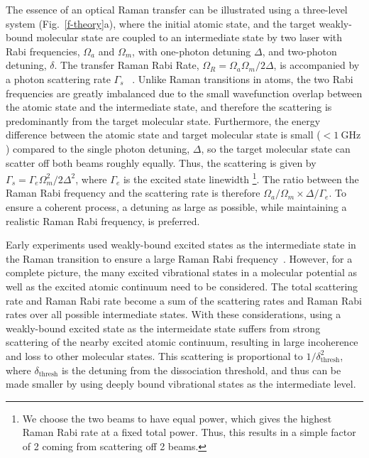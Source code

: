 \documentclass[aps,prl,twocolumn,10pt,superscriptaddress]{revtex4-1}
\begin{document}
The essence of an optical Raman transfer can be illustrated using a three-level system (Fig.~\ref{f-theory}a), where the initial atomic state, and the target weakly-bound molecular state are coupled to an intermediate state by two laser  with Rabi frequencies, $\Omega_a$ and $\Omega_m$, with one-photon detuning $ \Delta $, and two-photon detuning, $ \delta$.  %
The transfer Raman Rabi Rate, $\Omega_R=\Omega_a\Omega_m / 2\Delta$, is accompanied by a photon scattering rate $\Gamma_s$
~\cite{Wineland2003}.
Unlike Raman transitions in atoms, the two Rabi frequencies are greatly imbalanced %
due to the small wavefunction overlap between the atomic state and the intermediate state, %
and therefore the scattering is predominantly from the target molecular state. Furthermore, the energy difference between the atomic state and target molecular state is small ($ < 1~\mathrm{GHz} $) compared to the single photon detuning, $ \Delta $, so the target molecular state can scatter off both beams roughly equally. Thus, the scattering is given by $ \Gamma_s=\Gamma_e \Omega_m^2 / 2\Delta^2$, where $ \Gamma_e $ is the excited state linewidth \footnote{We choose the two beams to have equal power, which gives the highest Raman Rabi rate at a fixed total power. Thus, this results in a simple factor of 2 coming from scattering off 2 beams.}.
The ratio between the Raman Rabi frequency and the scattering rate is therefore $ \Omega_a/\Omega_m \times \Delta/\Gamma_e $. %
To ensure a coherent process, a detuning as large as possible, while maintaining a realistic Raman Rabi frequency, is preferred. %

Early experiments used weakly-bound excited states as the intermediate state
in the Raman transition to ensure a large Raman Rabi frequency~\cite{Wynar2000,Rom2004}.
However, for a complete picture, the many excited vibrational states in a molecular potential
as well as the excited atomic continuum need to be considered.
The total scattering rate and Raman Rabi rate become a sum of the scattering rates
and Raman Rabi rates over all possible intermediate states.
With these considerations, using a weakly-bound excited state as the intermeidate state
suffers from strong scattering of the nearby excited atomic continuum, resulting in large incoherence and loss to other molecular states.
This scattering is proportional to $1/\delta_{\mathrm{thresh}}^2$,
where $\delta_{\mathrm{thresh}}$ is the detuning from the dissociation threshold,
and thus can be made smaller by using deeply bound vibrational states as the intermediate level.
\end{document}
